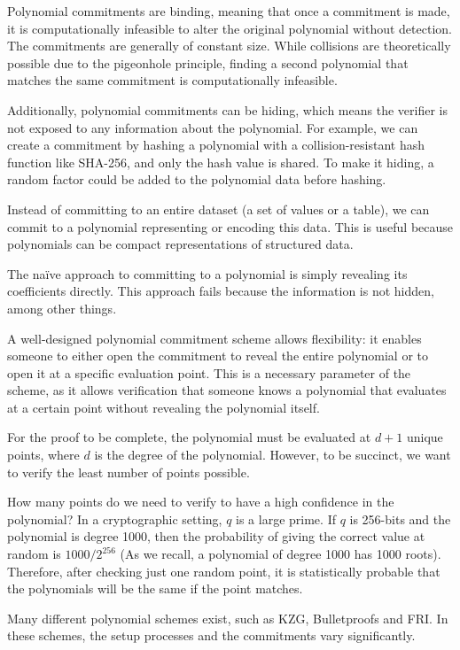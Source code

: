 Polynomial commitments are binding, meaning that once a commitment is made, it is computationally infeasible to alter the original polynomial without detection. 
The commitments are generally of constant size. While collisions are theoretically possible due to the pigeonhole principle, finding a second polynomial that matches the same commitment is computationally infeasible.

Additionally, polynomial commitments can be hiding, which means the verifier is not exposed to any information about the polynomial.
For example, we can create a commitment by hashing a polynomial with a collision-resistant hash function like SHA-256, and only the hash value is shared. 
To make it hiding, a random factor could be added to the polynomial data before hashing.

Instead of committing to an entire dataset (a set of values or a table), we can commit to a polynomial representing or encoding this data. 
This is useful because polynomials can be compact representations of structured data.

The naïve approach to committing to a polynomial is simply revealing its coefficients directly.
This approach fails because the information is not hidden, among other things.

A well-designed polynomial commitment scheme allows flexibility: it enables someone to either open the commitment to reveal the entire polynomial or to open it at a specific evaluation point. 
This is a necessary parameter of the scheme, as it allows verification that someone knows a polynomial that evaluates at a certain point without revealing the polynomial itself.

For the proof to be complete, the polynomial must be evaluated at $d+1$ unique points, where $d$ is the degree of the polynomial.
However, to be succinct, we want to verify the least number of points possible.

How many points do we need to verify to have a high confidence in the polynomial?
In a cryptographic setting, $q$ is a large prime. If $q$ is 256-bits and the polynomial is degree 1000, 
then the probability of giving the correct value at random is $1000/2^{256}$ (As we recall, a polynomial of degree 1000 has 1000 roots). 
Therefore, after checking just one random point, it is statistically probable that the polynomials will be the same if the point matches. \cite{VR23}

Many different polynomial schemes exist, such as KZG, Bulletproofs and FRI. 
In these schemes, the setup processes and the commitments vary significantly. 

